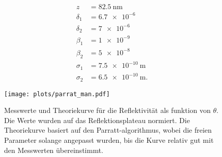 \begin{align*}
    z &= \SI{82.5}{\nm} \\
    \delta_1 &=\num{6.7e-6} \\
    \delta_2 &=\num{7e-6} \\
    \beta_1 &= \num{1e-9}\\ 
    \beta_2 &=\num{5e-8} \\
    \sigma_1 &= \SI{7.5e-10}{\metre} \\
    \sigma_2 &= \SI{6.5e-10}{\metre} .
\end{align*}
\begin{figure}
    \centering
    \texttt{[image: plots/parrat\_man.pdf]}
    \caption{Messwerte und Theoriekurve für die Reflektivität als funktion von $\theta$. Die Werte wurden auf das Reflektionsplateau normiert. Die Theoriekurve basiert auf den Parratt-algorithmus, wobei die freien Parameter solange angepasst wurden, bis die Kurve relativ gut mit den Messwerten übereinstimmt.}
    \label{fig:man}
\end{figure}